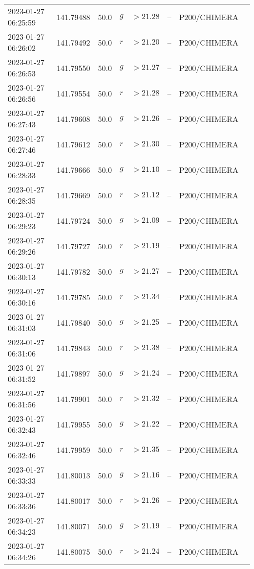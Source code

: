 \documentclass{nature_plusfigure}
\begin{document}
\begin{supplement}
\begin{center}
\begin{longtable}{llllllll}
2023-01-27 06:25:59 & 141.79488 & 50.0 & $g$ & $>21.28$ & -- & P200/CHIMERA &  \\ 
2023-01-27 06:26:02 & 141.79492 & 50.0 & $r$ & $>21.20$ & -- & P200/CHIMERA &  \\ 
2023-01-27 06:26:53 & 141.79550 & 50.0 & $g$ & $>21.27$ & -- & P200/CHIMERA &  \\ 
2023-01-27 06:26:56 & 141.79554 & 50.0 & $r$ & $>21.28$ & -- & P200/CHIMERA &  \\ 
2023-01-27 06:27:43 & 141.79608 & 50.0 & $g$ & $>21.26$ & -- & P200/CHIMERA &  \\ 
2023-01-27 06:27:46 & 141.79612 & 50.0 & $r$ & $>21.30$ & -- & P200/CHIMERA &  \\ 
2023-01-27 06:28:33 & 141.79666 & 50.0 & $g$ & $>21.10$ & -- & P200/CHIMERA &  \\ 
2023-01-27 06:28:35 & 141.79669 & 50.0 & $r$ & $>21.12$ & -- & P200/CHIMERA &  \\ 
2023-01-27 06:29:23 & 141.79724 & 50.0 & $g$ & $>21.09$ & -- & P200/CHIMERA &  \\ 
2023-01-27 06:29:26 & 141.79727 & 50.0 & $r$ & $>21.19$ & -- & P200/CHIMERA &  \\ 
2023-01-27 06:30:13 & 141.79782 & 50.0 & $g$ & $>21.27$ & -- & P200/CHIMERA &  \\ 
2023-01-27 06:30:16 & 141.79785 & 50.0 & $r$ & $>21.34$ & -- & P200/CHIMERA &  \\ 
2023-01-27 06:31:03 & 141.79840 & 50.0 & $g$ & $>21.25$ & -- & P200/CHIMERA &  \\ 
2023-01-27 06:31:06 & 141.79843 & 50.0 & $r$ & $>21.38$ & -- & P200/CHIMERA &  \\ 
2023-01-27 06:31:52 & 141.79897 & 50.0 & $g$ & $>21.24$ & -- & P200/CHIMERA &  \\ 
2023-01-27 06:31:56 & 141.79901 & 50.0 & $r$ & $>21.32$ & -- & P200/CHIMERA &  \\ 
2023-01-27 06:32:43 & 141.79955 & 50.0 & $g$ & $>21.22$ & -- & P200/CHIMERA &  \\ 
2023-01-27 06:32:46 & 141.79959 & 50.0 & $r$ & $>21.35$ & -- & P200/CHIMERA &  \\ 
2023-01-27 06:33:33 & 141.80013 & 50.0 & $g$ & $>21.16$ & -- & P200/CHIMERA &  \\ 
2023-01-27 06:33:36 & 141.80017 & 50.0 & $r$ & $>21.26$ & -- & P200/CHIMERA &  \\ 
2023-01-27 06:34:23 & 141.80071 & 50.0 & $g$ & $>21.19$ & -- & P200/CHIMERA &  \\ 
2023-01-27 06:34:26 & 141.80075 & 50.0 & $r$ & $>21.24$ & -- & P200/CHIMERA &  \\ 

\end{longtable}
\end{center}
\end{supplement}
\end{document}
